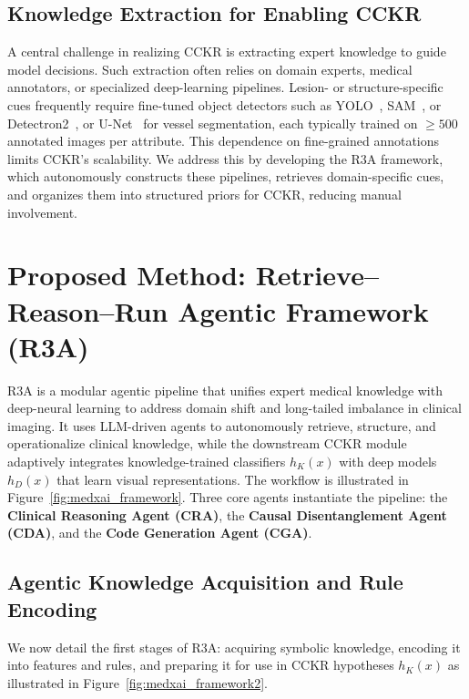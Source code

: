 \documentclass{article}
\begin{document}
\subsection{Knowledge Extraction for Enabling CCKR}

A central challenge in realizing CCKR is extracting expert knowledge to
guide model decisions. Such extraction often relies on domain experts,
medical annotators, or specialized deep-learning pipelines. Lesion- or
structure-specific cues frequently require fine-tuned object detectors such
as YOLO~\cite{redmon2016yolo}, SAM~\cite{kirillov2023sam}, or
Detectron2~\cite{wu2019detectron2}, or U-Net~\cite{ronneberger2015unet} for
vessel segmentation, each typically trained on $\ge 500$ annotated images
per attribute. This dependence on fine-grained annotations limits CCKR's
scalability. We address this by developing the R3A framework, which autonomously constructs these
pipelines, retrieves domain-specific cues, and organizes them into
structured priors for CCKR, reducing manual involvement.

\section{Proposed Method: Retrieve–Reason–Run Agentic Framework (R3A)}
\label{sec:method}

R3A is a modular agentic pipeline that unifies expert medical knowledge
with deep-neural learning to address domain shift and long-tailed imbalance
in clinical imaging. It uses LLM-driven agents to autonomously retrieve,
structure, and operationalize clinical knowledge, while the downstream CCKR
module adaptively integrates knowledge-trained classifiers $h_K(x)$ with
deep models $h_D(x)$ that learn visual representations. The workflow is
illustrated in Figure~\ref{fig:medxai_framework}. Three core agents
instantiate the pipeline: the \textbf{Clinical Reasoning Agent (CRA)}, the
\textbf{Causal Disentanglement Agent (CDA)}, and the \textbf{Code Generation
Agent (CGA)}.

\subsection{Agentic Knowledge Acquisition and Rule Encoding}

We now detail the first stages of R3A: acquiring symbolic knowledge,
encoding it into features and rules, and preparing it for use in CCKR
hypotheses $h_K(x)$ as illustrated in Figure~\ref{fig:medxai_framework2}.
\end{document}
